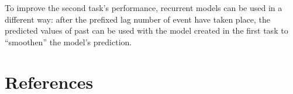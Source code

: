 To improve the second task's performance, recurrent models can be used in a different way: after the prefixed lag number of event have taken place, the predicted values of past can be used with the model created in the first task to ``smoothen'' the model's prediction.


\section*{References}





